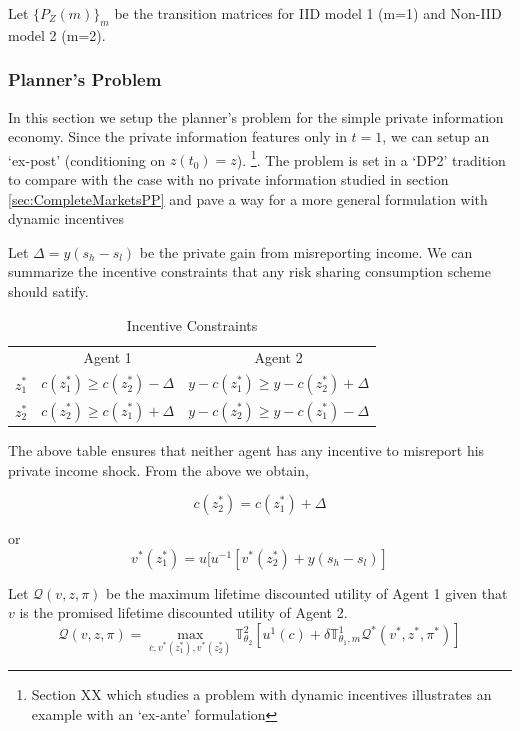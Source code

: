 \documentclass[12pt]{article}
\begin{document}
Let $\{P_Z(m)\}_m  $ be the transition matrices for IID model 1 (m=1) and
Non-IID model 2 (m=2). 


\subsubsection{Planner's Problem}
In this section we setup the planner's problem for the simple private information economy. Since the private information features only in $t=1$, we can setup an `ex-post' (conditioning on $z(t_0)=z$). \footnote{Section XX which studies a problem with dynamic incentives illustrates an example with an `ex-ante' formulation}. The problem is set in a `DP2'  tradition to compare with the case with no private information studied in section \ref{sec:CompleteMarketsPP} and pave a way for a more general formulation with dynamic incentives

Let $\Delta=y(s_h-s_l)$ be the private gain from misreporting income. We can summarize the incentive constraints that any risk sharing consumption scheme should satify.

\begin{table}[h]
  \centering
  \begin{tabular}[h]{l c c}
    
& Agent 1 & Agent 2 \\
$z^*_1$ & $c(z^*_1)\geq c(z^*_2)-\Delta$ & $y-c(z^*_1)\geq y-c(z^*_2)+\Delta$  \\
$z^*_2$ & $c(z^*_2)\geq c(z^*_1)+\Delta$ & $y-c(z^*_2)\geq y-c(z^*_1)-\Delta$  \\
 
  \end{tabular}
  
  \caption{Incentive Constraints}
  \label{tab:StaticICIneq}

\end{table}

The above table ensures that neither agent has any incentive to misreport his private income shock. From the above we obtain,

\[c(z^*_2)=c(z^*_1)+\Delta\]

or 
\begin{equation}
\label{eq:StaticIC0}
v^*(z^*_1) = u[u^{-1} \left[v^*(z^*_2) + y(s_h-s_l)\right] 
\end{equation}

\noindent Let $\mathcal{Q}(v,z,\pi)$ be the maximum lifetime discounted utility of Agent 1 given that $v$ is the promised lifetime discounted utility of Agent 2.
\begin{equation}
\label{eq:PPStaticPI}
\mathcal{Q}(v,z,\pi)=\max_{c,v^*(z^*_1),v^*(z^*_2)  } \mathbb{T}_{\theta_2}^{2}\left[u^1(c)+\delta \mathbb{T}_{\theta_1,m}^{1} \mathcal{Q}^*(v^*,z^*,\pi^*)\right]
\end{equation}
\end{document}
